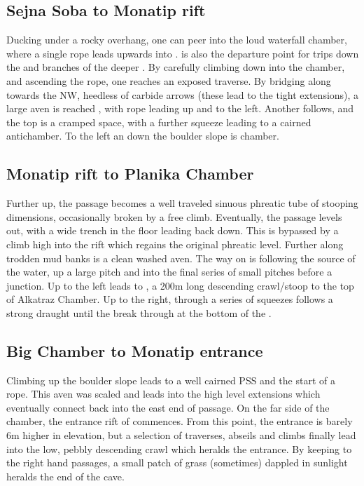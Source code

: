 \subsection{Sejna Soba to Monatip rift}
Ducking under a rocky overhang, one can peer into the loud waterfall chamber, where a single rope leads upwards into .  is also the departure point for trips down the  and  branches of the deeper . By carefully climbing down into the chamber, and ascending the rope, one reaches an exposed traverse. By bridging along towards the NW, heedless of carbide arrows (these lead to the tight  extensions), a large aven is reached , with rope leading up and to the left. Another follows, and the top is a cramped space, with a further squeeze leading to a cairned antichamber. To the left an down the boulder slope is  chamber.

\subsection{Monatip rift to Planika Chamber}
Further up, the passage becomes a well traveled sinuous phreatic tube of stooping dimensions, occasionally broken by a free climb. Eventually, the passage levels out, with a wide trench in the floor leading back down. This is bypassed by a climb high into the rift which regains the original phreatic level. Further along trodden mud banks is a clean washed aven. The way on is following the source of the water, up a large pitch and into the final series of small pitches before a junction. Up to the left leads to , a 200m long descending crawl/stoop to the top of Alkatraz Chamber.  Up to the right, through a series of squeezes follows a strong draught until the break through at the bottom of the  .

\subsection{Big Chamber to Monatip entrance}
Climbing up the boulder slope leads to a well cairned PSS and the start of a rope. This aven was scaled and leads into the high level  extensions which eventually connect back into the east end of  passage.  On the far side of the chamber, the entrance rift of  commences. From this point, the entrance is barely 6m higher in elevation, but a selection of traverses, abseils and climbs finally lead into the low, pebbly descending crawl which heralds the entrance. By keeping to the right hand passages, a small patch of grass (sometimes) dappled in sunlight heralds the end of the cave. 

